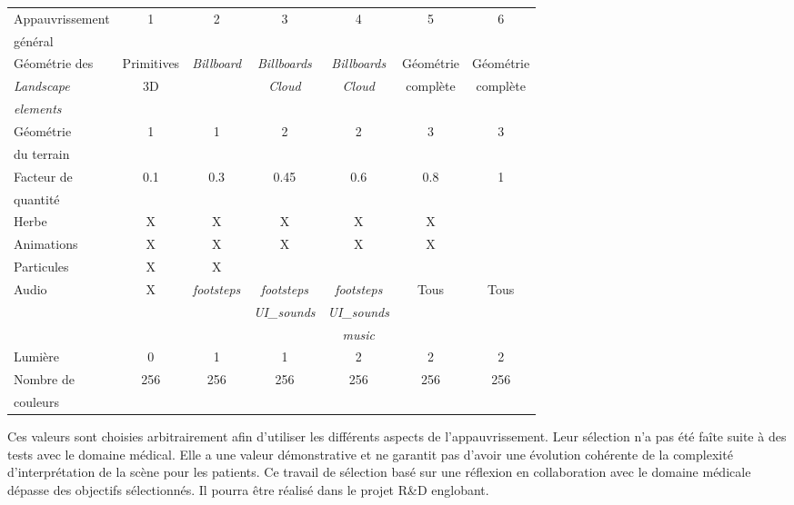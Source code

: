 		\begin{minipage}{\linewidth}
			\begin{tabular}{|l|c|c|c|c|c|c|}
				\hline
				Appauvrissement&	1&	2&	3&	4&	5&	6 \\
				général&	&	&	&	& &	\\
				\hline
				
				Géométrie des& Primitives&	\textit{Billboard}&	\textit{Billboards}&	\textit{Billboards}&	Géométrie	&	Géométrie \\
				\textit{Landscape} & 3D& &	\textit{Cloud}&	\textit{Cloud}&	complète	&	complète \\
				\textit{elements}& & & & & & \\
				\hline
				
				Géométrie&		1&	1&	2&	2&	3&	3 \\
				du terrain& & & & & & \\
				\hline
				Facteur de&		0.1&	0.3&	0.45&	0.6&	0.8&	1 \\
				quantité& & & & & & \\
				\hline
				Herbe&		\textsf{X}&	\textsf{X}&	\textsf{X}&	\textsf{X}&	\textsf{X}&	\checkmark \\
				\hline
				Animations&		\textsf{X}&	\textsf{X}&	\textsf{X}&	\textsf{X}&	\textsf{X}&	\checkmark \\
				\hline
				Particules&		\textsf{X}&	\textsf{X}&	\checkmark&	\checkmark&	\checkmark&	\checkmark \\
				\hline
				Audio&		\textsf{X}&	\textit{footsteps}&	\textit{footsteps}&	\textit{footsteps}&	Tous&	Tous \\
				&		&	& \textit{UI\_sounds}& \textit{UI\_sounds}&	&	\\
				&		&	&	&	\textit{music}&	&	\\
				\hline
				
				Lumière&		0&	1&	1&	2&	2&	2 \\
				\hline
				Nombre de &		256&	256&	256&	256&	256&	256 \\
				couleurs& & & & & & \\
				\hline
			\end{tabular}
			\label{tableGeneralImpoverishment}	
		\end{minipage}\medskip
		
		Ces valeurs sont choisies arbitrairement afin d'utiliser les différents aspects de l'appauvrissement. Leur sélection n'a pas été faîte suite à des tests avec le domaine médical. Elle a une valeur démonstrative et ne garantit pas d'avoir une évolution cohérente de la complexité d'interprétation de la scène pour les patients. Ce travail de sélection basé sur une réflexion en collaboration avec le domaine médicale dépasse des objectifs sélectionnés. Il pourra être réalisé dans le projet R\&D englobant.
		
